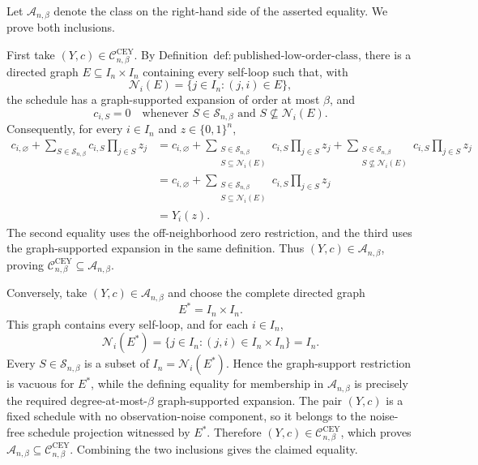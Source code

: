 Let \(\mathcal A_{n,\beta}\) denote the class on the right-hand side of the asserted equality.  We prove both inclusions.

First take \((Y,c)\in\mathcal C^{\mathrm{CEY}}_{n,\beta}\).  By Definition~\(\mathrm{def{:}published\text{-}low\text{-}order\text{-}class}\), there is a directed graph \(E\subseteq I_n\times I_n\) containing every self-loop such that, with
\[
\mathcal N_i(E)=\{j\in I_n:(j,i)\in E\},
\]
the schedule has a graph-supported expansion of order at most \(\beta\), and
\[
c_{i,S}=0
\quad\text{whenever }S\in\mathcal S_{n,\beta}
\text{ and }S\nsubseteq\mathcal N_i(E).
\]
Consequently, for every \(i\in I_n\) and \(z\in\{0,1\}^n\),
\[
\begin{aligned}
c_{i,\varnothing}
+\sum_{S\in\mathcal S_{n,\beta}}c_{i,S}\prod_{j\in S}z_j
&=c_{i,\varnothing}
+\sum_{\substack{S\in\mathcal S_{n,\beta}\\S\subseteq\mathcal N_i(E)}}
c_{i,S}\prod_{j\in S}z_j
+\sum_{\substack{S\in\mathcal S_{n,\beta}\\S\nsubseteq\mathcal N_i(E)}}
c_{i,S}\prod_{j\in S}z_j\\
&=c_{i,\varnothing}
+\sum_{\substack{S\in\mathcal S_{n,\beta}\\S\subseteq\mathcal N_i(E)}}
c_{i,S}\prod_{j\in S}z_j\\
&=Y_i(z).
\end{aligned}
\]
The second equality uses the off-neighborhood zero restriction, and the third uses the graph-supported expansion in the same definition.  Thus \((Y,c)\in\mathcal A_{n,\beta}\), proving
\(\mathcal C^{\mathrm{CEY}}_{n,\beta}\subseteq\mathcal A_{n,\beta}\).

Conversely, take \((Y,c)\in\mathcal A_{n,\beta}\) and choose the complete directed graph
\[
E^*=I_n\times I_n.
\]
This graph contains every self-loop, and for each \(i\in I_n\),
\[
\mathcal N_i(E^*)
=\{j\in I_n:(j,i)\in I_n\times I_n\}
=I_n.
\]
Every \(S\in\mathcal S_{n,\beta}\) is a subset of \(I_n=\mathcal N_i(E^*)\).  Hence the graph-support restriction is vacuous for \(E^*\), while the defining equality for membership in \(\mathcal A_{n,\beta}\) is precisely the required degree-at-most-\(\beta\) graph-supported expansion.  The pair \((Y,c)\) is a fixed schedule with no observation-noise component, so it belongs to the noise-free schedule projection witnessed by \(E^*\).  Therefore \((Y,c)\in\mathcal C^{\mathrm{CEY}}_{n,\beta}\), which proves \(\mathcal A_{n,\beta}\subseteq\mathcal C^{\mathrm{CEY}}_{n,\beta}\).  Combining the two inclusions gives the claimed equality.